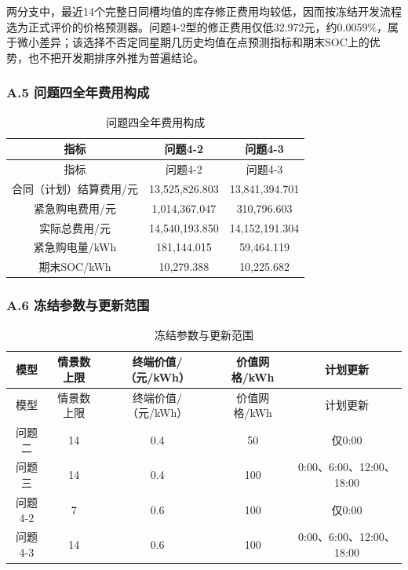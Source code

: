 \documentclass[zihao=-4,a4paper,UTF8,fontset=none]{ctexart}
\begin{document}
\endgroup

两分支中，最近14个完整日同槽均值的库存修正费用均较低，因而按冻结开发流程选为正式评价的价格预测器。问题4-2型的修正费用仅低32.972元，约0.0059\%，属于微小差异；该选择不否定同星期几历史均值在点预测指标和期末SOC上的优势，也不把开发期排序外推为普遍结论。

\par\pagebreak[2]\subsubsection*{A.5 问题四全年费用构成}

\begingroup\renewcommand{\tablename}{附表}\renewcommand{\thetable}{A-5}

\begin{longtable}[]{@{}ccc@{}}
\caption{问题四全年费用构成}\label{tab:appendix-A-5}\tabularnewline
\toprule\noalign{}
指标 & 问题4-2 & 问题4-3 \\
\midrule\noalign{}
\endfirsthead
\toprule\noalign{}
指标 & 问题4-2 & 问题4-3 \\
\midrule\noalign{}
\endhead
\bottomrule\noalign{}
\endlastfoot
合同（计划）结算费用/元 & 13,525,826.803 & 13,841,394.701 \\
紧急购电费用/元 & 1,014,367.047 & 310,796.603 \\
实际总费用/元 & 14,540,193.850 & 14,152,191.304 \\
紧急购电量/kWh & 181,144.015 & 59,464.119 \\
期末SOC/kWh & 10,279.388 & 10,225.682 \\
\end{longtable}

\endgroup

\par\pagebreak[2]\subsubsection*{A.6 冻结参数与更新范围}

\begingroup\renewcommand{\tablename}{附表}\renewcommand{\thetable}{A-6}

\begin{longtable}[]{@{}ccccc@{}}
\caption{冻结参数与更新范围}\label{tab:appendix-A-6}\tabularnewline
\toprule\noalign{}
模型 & 情景数上限 & 终端价值/（元/kWh） & 价值网格/kWh & 计划更新 \\
\midrule\noalign{}
\endfirsthead
\toprule\noalign{}
模型 & 情景数上限 & 终端价值/（元/kWh） & 价值网格/kWh & 计划更新 \\
\midrule\noalign{}
\endhead
\bottomrule\noalign{}
\endlastfoot
问题二 & 14 & 0.4 & 50 & 仅0:00 \\
问题三 & 14 & 0.4 & 100 & 0:00、6:00、12:00、18:00 \\
问题4-2 & 7 & 0.6 & 100 & 仅0:00 \\
问题4-3 & 14 & 0.6 & 100 & 0:00、6:00、12:00、18:00 \\
\end{longtable}
\end{document}
